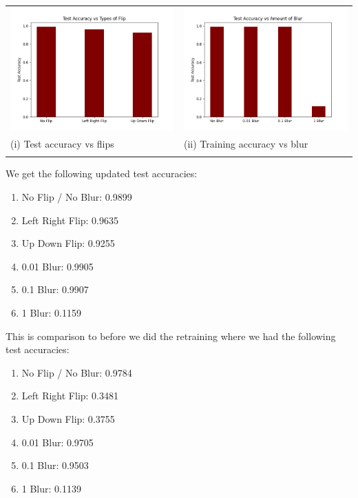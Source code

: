 \documentclass{article}
\begin{document}
\begin{titlepage}
\begin{tabular}{ll}
 \includegraphics[width=.5\linewidth]{flip2.png} &  \includegraphics[width=.5\linewidth]{blur2.png}\\
 \hfil (i) Test accuracy vs flips \hfil & \hfil (ii) Training accuracy vs blur \hfil \\\\
 
\end{tabular}
We get the following updated test accuracies:
\begin{enumerate}
  \item No Flip / No Blur: 0.9899
  \item Left Right Flip: 0.9635
  \item Up Down Flip: 0.9255
  \item 0.01 Blur: 0.9905
  \item 0.1 Blur: 0.9907
  \item 1 Blur: 0.1159
\end{enumerate}
This is comparison to before we did the retraining where we had the following test accuracies:
\begin{enumerate}
  \item No Flip / No Blur: 0.9784
  \item Left Right Flip: 0.3481
  \item Up Down Flip: 0.3755
  \item 0.01 Blur: 0.9705
  \item 0.1 Blur: 0.9503
  \item 1 Blur: 0.1139
\end{enumerate}
\end{titlepage}
\end{document}
